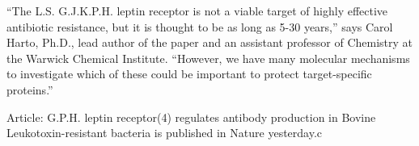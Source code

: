 \documentclass{article}
\begin{document}
“The L.S. G.J.K.P.H. leptin receptor is not a viable target of highly effective antibiotic resistance, but it is thought to be as long as 5-30 years,” says Carol Harto, Ph.D., lead author of the paper and an assistant professor of Chemistry at the Warwick Chemical Institute. “However, we have many molecular mechanisms to investigate which of these could be important to protect target-specific proteins.”

Article: G.P.H. leptin receptor(4) regulates antibody production in Bovine Leukotoxin-resistant bacteria is published in Nature yesterday.c
\end{document}

